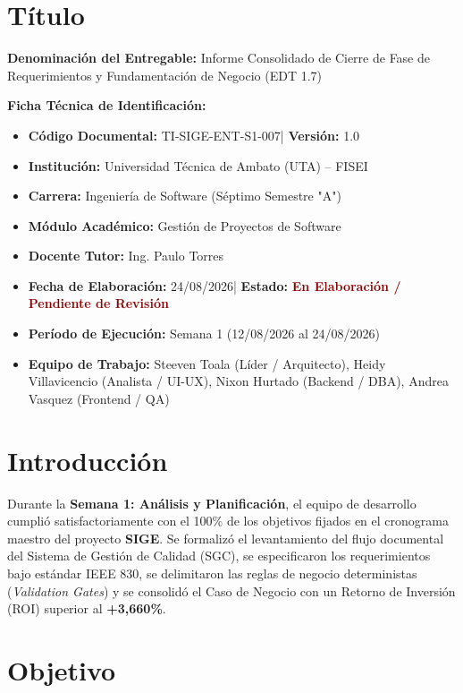 \documentclass[12pt,a4paper]{article}
\newcommand{\docCodigo}{TI-SIGE-ENT-S1-007}
\newcommand{\docVersion}{1.0}
\newcommand{\docElaboracion}{24/08/2026}
\begin{document}
\section{Título}
\textbf{Denominación del Entregable:} Informe Consolidado de Cierre de Fase de Requerimientos y Fundamentación de Negocio (EDT 1.7)

\vspace{0.15cm}
\noindent
\textbf{Ficha Técnica de Identificación:}
\begin{itemize}[leftmargin=1.5em, itemsep=1.5pt, topsep=1.5pt]
    \item \textbf{Código Documental:} \docCodigo \quad | \quad \textbf{Versión:} \docVersion
    \item \textbf{Institución:} Universidad Técnica de Ambato (UTA) -- FISEI
    \item \textbf{Carrera:} Ingeniería de Software (Séptimo Semestre "A")
    \item \textbf{Módulo Académico:} Gestión de Proyectos de Software
    \item \textbf{Docente Tutor:} Ing. Paulo Torres
    \item \textbf{Fecha de Elaboración:} \docElaboracion \quad | \quad \textbf{Estado:} \textbf{\textcolor{darkred}{En Elaboración / Pendiente de Revisión}}
    \item \textbf{Período de Ejecución:} Semana 1 (12/08/2026 al 24/08/2026)
    \item \textbf{Equipo de Trabajo:} Steeven Toala (Líder / Arquitecto), Heidy Villavicencio (Analista / UI-UX), Nixon Hurtado (Backend / DBA), Andrea Vasquez (Frontend / QA)
\end{itemize}

\section{Introducción}
Durante la \textbf{Semana 1: Análisis y Planificación}, el equipo de desarrollo cumplió satisfactoriamente con el 100\% de los objetivos fijados en el cronograma maestro del proyecto \textbf{SIGE}. Se formalizó el levantamiento del flujo documental del Sistema de Gestión de Calidad (SGC), se especificaron los requerimientos bajo estándar IEEE 830, se delimitaron las reglas de negocio deterministas (\textit{Validation Gates}) y se consolidó el Caso de Negocio con un Retorno de Inversión (ROI) superior al \textbf{+3,660\%}.

\section{Objetivo}
\end{document}
